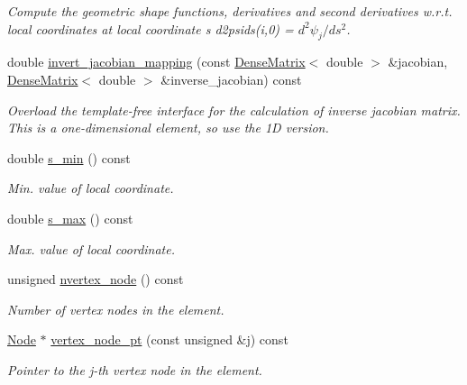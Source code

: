 \begin{DoxyCompactItemize}
\begin{DoxyCompactList}\small\item\em Compute the geometric shape functions, derivatives and second derivatives w.\+r.\+t. local coordinates at local coordinate s d2psids(i,0) = $ d^2 \psi_j / d s^2 $. \end{DoxyCompactList}\item 
double \hyperlink{classoomph_1_1QElement_3_011_00_01NNODE__1D_01_4_a932877fb096598bbfc120d2084e2a62f}{invert\+\_\+jacobian\+\_\+mapping} (const \hyperlink{classoomph_1_1DenseMatrix}{Dense\+Matrix}$<$ double $>$ \&jacobian, \hyperlink{classoomph_1_1DenseMatrix}{Dense\+Matrix}$<$ double $>$ \&inverse\+\_\+jacobian) const
\begin{DoxyCompactList}\small\item\em Overload the template-\/free interface for the calculation of inverse jacobian matrix. This is a one-\/dimensional element, so use the 1D version. \end{DoxyCompactList}\item 
double \hyperlink{classoomph_1_1QElement_3_011_00_01NNODE__1D_01_4_a9fe7074b59a681c7face3f20349eb128}{s\+\_\+min} () const
\begin{DoxyCompactList}\small\item\em Min. value of local coordinate. \end{DoxyCompactList}\item 
double \hyperlink{classoomph_1_1QElement_3_011_00_01NNODE__1D_01_4_af391160512c8202d14800208b482e5d6}{s\+\_\+max} () const
\begin{DoxyCompactList}\small\item\em Max. value of local coordinate. \end{DoxyCompactList}\item 
unsigned \hyperlink{classoomph_1_1QElement_3_011_00_01NNODE__1D_01_4_a751317144972c615b0a7ef7b1340b692}{nvertex\+\_\+node} () const
\begin{DoxyCompactList}\small\item\em Number of vertex nodes in the element. \end{DoxyCompactList}\item 
\hyperlink{classoomph_1_1Node}{Node} $\ast$ \hyperlink{classoomph_1_1QElement_3_011_00_01NNODE__1D_01_4_ab6e699d62c9c1208b8e2726f5d236a20}{vertex\+\_\+node\+\_\+pt} (const unsigned \&j) const
\begin{DoxyCompactList}\small\item\em Pointer to the j-\/th vertex node in the element. \end{DoxyCompactList}\item 

\end{DoxyCompactItemize}

